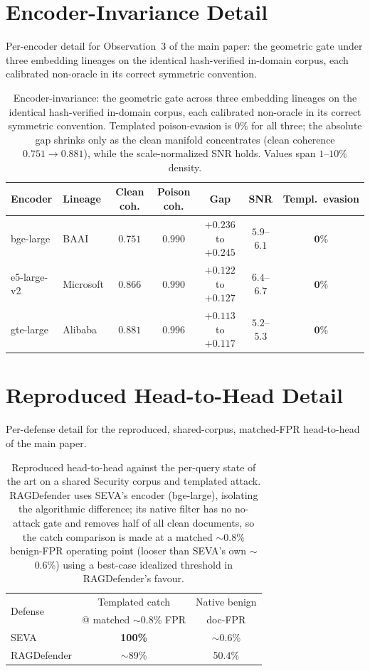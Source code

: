 \documentclass[conference]{IEEEtran}
\begin{document}
\section{Encoder-Invariance Detail}
\label{app:encoder}
Per-encoder detail for Observation~3 of the main paper: the geometric gate under three embedding lineages on the identical hash-verified in-domain corpus, each calibrated non-oracle in its correct symmetric convention.

\begin{table}[htbp]
\centering
\caption{Encoder-invariance: the geometric gate across three embedding lineages on the
identical hash-verified in-domain corpus, each calibrated non-oracle in its correct
symmetric convention. Templated poison-evasion is $0\%$ for all three; the absolute gap
shrinks only as the clean manifold concentrates (clean coherence $0.751\!\to\!0.881$),
while the scale-normalized SNR holds. Values span $1$--$10\%$ density.}
\label{tab:encoder}
\begin{tabular}{llccccc}
\toprule
Encoder & Lineage & Clean coh. & Poison coh. & Gap & SNR & Templ.\ evasion \\
\midrule
bge-large   & BAAI      & $0.751$ & $0.990$ & $+0.236$ to $+0.245$ & $5.9$--$6.1$ & $\mathbf{0\%}$ \\
e5-large-v2 & Microsoft & $0.866$ & $0.990$ & $+0.122$ to $+0.127$ & $6.4$--$6.7$ & $\mathbf{0\%}$ \\
gte-large   & Alibaba   & $0.881$ & $0.996$ & $+0.113$ to $+0.117$ & $5.2$--$5.3$ & $\mathbf{0\%}$ \\
\bottomrule
\end{tabular}
\end{table}

\section{Reproduced Head-to-Head Detail}
\label{app:h2h}
Per-defense detail for the reproduced, shared-corpus, matched-FPR head-to-head of the main paper.

\begin{table}[htbp]
\centering
\caption{Reproduced head-to-head against the per-query state of the art on a
shared Security corpus and templated attack. RAGDefender uses SEVA's encoder
(bge-large), isolating the algorithmic difference; its native filter has no
no-attack gate and removes half of all clean documents, so the catch comparison
is made at a matched $\sim$0.8\% benign-FPR operating point (looser than SEVA's own
$\sim$0.6\%) using a best-case idealized threshold in RAGDefender's favour.}
\label{tab:h2h}
\begin{tabular}{lcc}
\toprule
\multirow{2}{*}{Defense} & Templated catch & Native benign \\
        & @ matched $\sim$0.8\% FPR & doc-FPR \\
\midrule
SEVA & \textbf{100\%} & $\sim$0.6\% \\
RAGDefender & $\sim$89\% & 50.4\% \\
\bottomrule
\end{tabular}
\end{table}
\end{document}

